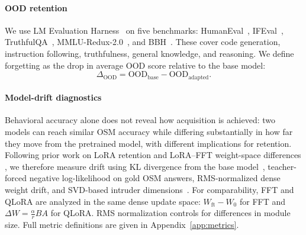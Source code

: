 \documentclass[11pt]{article}
\begin{document}
\paragraph{OOD retention} 
We use LM Evaluation Harness~\citep{eval-harness} on five benchmarks:
HumanEval~\citep{chen2021evaluating}, IFEval~\citep{zhou2023instruction},
TruthfulQA~\citep{lin-etal-2022-truthfulqa},
MMLU-Redux-2.0~\citep{gema-etal-2025-done}, and
BBH~\citep{suzgun-etal-2023-challenging}. These cover code generation,
instruction following, truthfulness, general knowledge, and reasoning. We define
forgetting as the drop in average OOD score relative to the base model:
\[
\Delta_{\mathrm{OOD}}
=
\mathrm{OOD}_{\mathrm{base}}
-
\mathrm{OOD}_{\mathrm{adapted}}.
\]


\paragraph{Model-drift diagnostics}
Behavioral accuracy alone does not reveal how acquisition is achieved: two
models can reach similar OSM accuracy while differing substantially in how far
they move from the pretrained model, with different implications for retention.
Following prior work on LoRA retention and LoRA--FFT weight-space differences
\citep{biderman2024lora,shuttleworth2024lora}, we therefore measure drift using
KL divergence from the base model~\citep{shenfeld2026rls}, teacher-forced
negative log-likelihood on gold OSM answers, RMS-normalized dense weight drift,
and SVD-based intruder dimensions~\citep{pmlr-v9-glorot10a,shuttleworth2024lora}.
For comparability, FFT and QLoRA are analyzed in the same dense update space:
$W_{\mathrm{ft}} - W_0$ for FFT and
$\Delta W = \frac{\alpha}{r}BA$ for QLoRA. RMS normalization controls for
differences in module size. Full metric definitions are given in
Appendix~\ref{app:metrics}.
\end{document}
